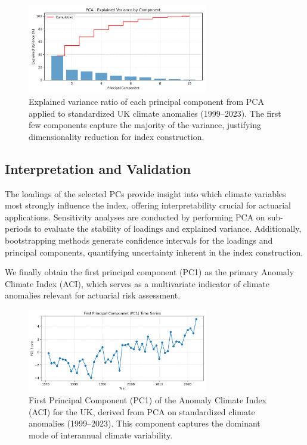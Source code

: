 \documentclass[12pt,a4paper]{report}
\begin{document}
\begin{figure}[H]
    \centering
    \includegraphics[width=0.7\textwidth]{pca_explained_variance_report.png}
    \caption{Explained variance ratio of each principal component from PCA applied to standardized UK climate anomalies (1999--2023). 
    The first few components capture the majority of the variance, justifying dimensionality reduction for index construction.}
    \label{fig:pca_explained_variance}
\end{figure}
\subsection{Interpretation and Validation}
The loadings of the selected PCs provide insight into which climate variables most strongly influence the index, offering interpretability crucial for actuarial applications. 
Sensitivity analyses are conducted by performing PCA on sub-periods to evaluate the stability of loadings and explained variance. 
Additionally, bootstrapping methods generate confidence intervals for the loadings and principal components, quantifying uncertainty inherent in the index construction.

We finally obtain the first principal component (PC1) as the primary Anomaly Climate Index (ACI), 
which serves as a multivariate indicator of climate anomalies relevant for actuarial risk assessment.

\begin{figure}[H]
    \centering
    \includegraphics[width=0.7\textwidth]{pc1_ts.png}
    \caption{First Principal Component (PC1) of the Anomaly Climate Index (ACI) for the UK, derived from PCA on standardized climate anomalies (1999--2023). 
    This component captures the dominant mode of interannual climate variability.}
    \label{fig:aci_pca}
\end{figure}
\end{document}
